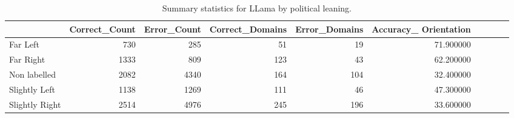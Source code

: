 \begin{table}
\caption{Summary statistics for LLama by political leaning.}
\label{tab:cm_summary_llama}
\begin{tabular}{lrrrrr}
\toprule
 & Correct_Count & Error_Count & Correct_Domains & Error_Domains & Accuracy_%
Orientation &  &  &  &  &  \\
\midrule
Far Left & 730 & 285 & 51 & 19 & 71.900000 \\
Far Right & 1333 & 809 & 123 & 43 & 62.200000 \\
Non labelled & 2082 & 4340 & 164 & 104 & 32.400000 \\
Slightly Left & 1138 & 1269 & 111 & 46 & 47.300000 \\
Slightly Right & 2514 & 4976 & 245 & 196 & 33.600000 \\
\bottomrule
\end{tabular}
\end{table}
